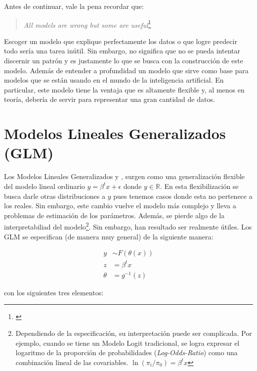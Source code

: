 \documentclass[../Main/Main.tex]{subfiles}
\begin{document}
Antes de continuar, vale la pena recordar que:

\begin{quote}
\textit{All models are wrong but some are useful}\footnote{\autocite{box1979robustnessinthe}}
\end{quote}

Escoger un modelo que explique perfectamente los datos o que logre predecir todo sería una tarea inútil. Sin embargo, no significa que no se pueda intentar discernir un patrón y es justamente lo que se busca con la construcción de este modelo. Además de entender a profundidad un modelo que sirve como base para modelos que se están usando en el mundo de la inteligencia artificial. En particular, este modelo tiene la ventaja que es altamente flexible y, al menos en teoría, debería de servir para representar una gran cantidad de datos.

\section{Modelos Lineales Generalizados (GLM)} \label{sec:GLM}
Los Modelos Lineales Generalizados \autocite{sundberg2016exponential} y \autocite{maccullagh1989generalized}, surgen como una generalización flexible del modelo lineal ordinario $y = \beta^tx + \epsilon$ donde $y\in\mathbb{R}$. En esta flexibilización  se busca darle otras distribuciones a $y$ pues tenemos casos donde esta no pertenece a los reales. Sin embargo, este cambio vuelve el modelo más complejo y lleva a problemas de estimación de los parámetros. Además, se pierde algo de la interpretabiliad del modelo\footnote{Dependiendo de la especificación, su interpretación puede ser complicada. Por ejemplo, cuando se tiene un Modelo Logit tradicional, se logra expresar el logaritmo de la proporción de probabilidades (\textit{Log-Odds-Ratio}) como una combinación lineal de las covariables. $\ln(\pi_i / \pi_0) = \beta^t x$}. Sin embargo, han resultado ser realmente útiles. Los GLM se especifican (de manera muy general) de la siguiente manera:

\begin{align*}
	y &\sim F(\theta(x)) \\
	z &= \beta^tx \\
	\theta &= g^{-1}(z) 
\end{align*}

con los siguientes tres elementos:
\end{document}
